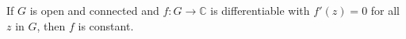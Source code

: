 If $G$ is open and connected and $f: G \to \mathbb{C}$ is differentiable with $f'(z) = 0$ for all $z$ in $G$, then $f$ is constant.